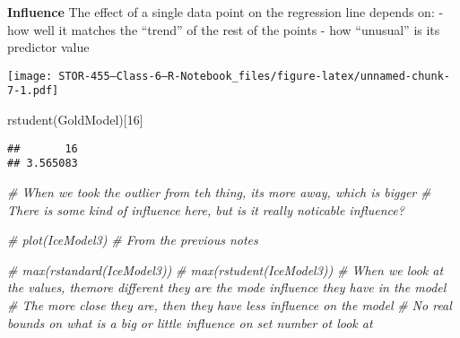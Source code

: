 \documentclass[
]{article}
\newenvironment{Shaded}{\begin{snugshade}}{\end{snugshade}}
\newcommand{\CommentTok}[1]{\textcolor[rgb]{0.56,0.35,0.01}{\textit{#1}}}
\newcommand{\DecValTok}[1]{\textcolor[rgb]{0.00,0.00,0.81}{#1}}
\newcommand{\FunctionTok}[1]{\textcolor[rgb]{0.00,0.00,0.00}{#1}}
\newcommand{\NormalTok}[1]{#1}
\newcommand{\SpecialCharTok}[1]{\textcolor[rgb]{0.00,0.00,0.00}{#1}}
\begin{document}
\textbf{Influence} The effect of a single data point on the regression
line depends on: - how well it matches the ``trend'' of the rest of the
points - how ``unusual'' is its predictor value

\begin{Shaded}
\end{Shaded}

\texttt{[image: STOR-455---Class-6---R-Notebook\_files/figure-latex/unnamed-chunk-7-1.pdf]}

\begin{Shaded}
\begin{Highlighting}[]
\FunctionTok{rstudent}\NormalTok{(GoldModel)[}\DecValTok{16}\NormalTok{]}
\end{Highlighting}
\end{Shaded}

\begin{verbatim}
##       16 
## 3.565083
\end{verbatim}

\begin{Shaded}
\begin{Highlighting}[]
\CommentTok{\# When we took the outlier from teh thing, its more away, which is bigger }
\CommentTok{\# There is some kind of influence here, but is it really noticable influence? }
\end{Highlighting}
\end{Shaded}

\begin{Shaded}
\begin{Highlighting}[]
\CommentTok{\# plot(IceModel3) \# From the previous notes }

\CommentTok{\# max(rstandard(IceModel3))}
\CommentTok{\# max(rstudent(IceModel3))}
\CommentTok{\# When we look at the values, themore different they are the mode influence they have in the model }
\CommentTok{\# The more close they are, then they have less influence on the model }
\CommentTok{\# No real bounds on what is a big or little influence on set number ot look at }
\end{Highlighting}
\end{Shaded}
\end{document}
